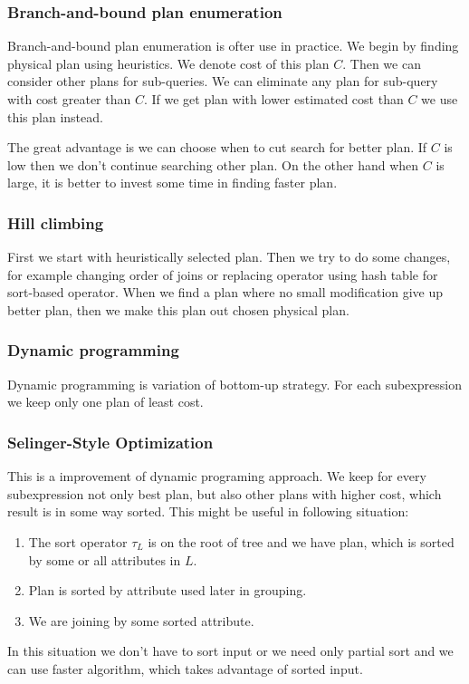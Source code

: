 \subsubsection{Branch-and-bound plan enumeration}
Branch-and-bound plan enumeration is ofter use in practice. We begin by finding physical plan using heuristics. We denote cost of this plan $C$. Then we can consider other plans for sub-queries. We can eliminate any plan for sub-query with cost greater than $C$. If we get plan with lower estimated cost than $C$ we use this plan instead.

The great advantage is we can choose when to cut search for better plan. If $C$ is low then we don't continue searching other plan. On the other hand when $C$ is large, it is better to invest some time in finding faster plan.
\subsubsection{Hill climbing}

First we start with heuristically selected plan. Then we try to do some changes, for example changing order of joins or replacing operator using hash table for sort-based operator. When we find a plan where no small modification give up better plan, then we make this plan out chosen physical plan.

\subsubsection{Dynamic programming}
Dynamic programming is variation of bottom-up strategy. For each subexpression we keep only one plan of least cost.

\subsubsection{Selinger-Style Optimization}
This is a improvement of dynamic programing approach. We keep for every subexpression not only best plan, but also other plans with higher cost, which result is in some way sorted. This might be useful in following situation:
\begin{enumerate}
\item The sort operator $\tau_L$ is on the root of tree and we have plan, which is sorted by some or all attributes in $L$.
\item Plan is sorted by attribute used later in grouping.
\item We are joining by some sorted attribute.
\end{enumerate}
In this situation we don't have to sort input or we need only partial sort and we can use faster algorithm, which takes advantage of sorted input.


